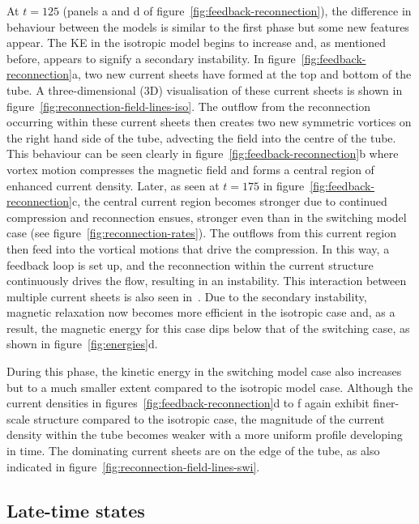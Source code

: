 At $t=125$ (panels a and d of figure~\ref{fig:feedback-reconnection}), the difference in behaviour
between the models is similar to the first phase but some new features
appear. The KE in the isotropic model begins to increase and, as
mentioned before, appears to signify a secondary instability. In
figure~\ref{fig:feedback-reconnection}a, two new current sheets have
formed at the top and bottom of the tube. A three-dimensional (3D)
visualisation of these current sheets is shown in
figure~\ref{fig:reconnection-field-lines-iso}. The outflow from the
reconnection occurring within these current sheets then creates two
new symmetric vortices on the right hand side of the tube, advecting
the field into the centre of the tube. This behaviour can be seen
clearly in figure~\ref{fig:feedback-reconnection}b where vortex
motion compresses the magnetic field and forms a central region of
enhanced current density. Later, as seen at $t=175$ in figure~\ref{fig:feedback-reconnection}c, the central current region becomes stronger due to continued compression and reconnection ensues, stronger even than in the switching model case (see figure~\ref{fig:reconnection-rates}). The outflows from this current region then feed into the vortical motions that drive the compression. In this way, a feedback loop is set up, and the reconnection within the current structure continuously drives the flow, resulting in an instability. This interaction between multiple current sheets is also seen in~\cite{hoodCoronalHeatingMagnetic2009}. Due to the secondary instability, magnetic relaxation now becomes more efficient in the isotropic case and, as a result, the magnetic energy for this case dips below that of the switching case, as shown in figure~\ref{fig:energies}d.

During this phase, the kinetic energy in the switching model case also increases but to a much smaller extent compared to the isotropic model case. Although the current densities in figures~\ref{fig:feedback-reconnection}d to f again exhibit finer-scale structure compared to the isotropic case, the magnitude of the current density within the tube becomes weaker with a more uniform profile developing in time. The dominating current sheets are on the edge of the tube, as also indicated in figure~\ref{fig:reconnection-field-lines-swi}.

\subsection{Late-time states}


